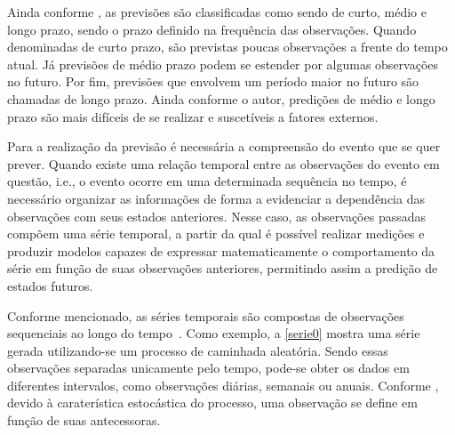 \documentclass[
    12pt,
    oneside,
    a4paper,
    english,
    brazil
]{abntex2}
\begin{document}
Ainda conforme  , as  previsões são classificadas  como sendo
de  curto,  médio  e  longo  prazo,   sendo  o  prazo  definido  na  frequência
das  observações.  Quando denominadas  de  curto  prazo, são  previstas  poucas
observações  a frente  do tempo  atual. Já  previsões de  médio prazo  podem se
estender por algumas observações no futuro.  Por fim, previsões que envolvem um
período maior  no futuro são chamadas  de longo prazo. Ainda  conforme o autor,
predições de médio e longo prazo são mais difíceis de se realizar e suscetíveis
a fatores externos.


Para a realização da previsão é necessária  a compreensão do evento que se quer
prever. Quando  existe uma relação temporal  entre as observações do  evento em
questão,  i.e., o  evento  ocorre  em uma  determinada  sequência  no tempo,  é
necessário organizar  as informações  de forma a  evidenciar a  dependência das
observações com  seus estados anteriores.  Nesse caso, as  observações passadas
compõem uma  série temporal, a  partir da qual  é possível realizar  medições e
produzir modelos capazes de expressar  matematicamente o comportamento da série
em  função de  suas  observações  anteriores, permitindo  assim  a predição  de
estados futuros.


Conforme  mencionado,   as  séries  temporais  são   compostas  de  observações
sequenciais ao  longo do  tempo~\cite{wiley}. Como exemplo,  a \autoref{serie0}
mostra uma série gerada utilizando-se um processo de caminhada aleatória. Sendo
essas observações  separadas unicamente pelo  tempo, pode-se obter os  dados em
diferentes intervalos, como observações diárias, semanais ou anuais.
Conforme ,  devido à caraterística estocástica  do processo,
uma observação se define em função de suas antecessoras.
\end{document}
